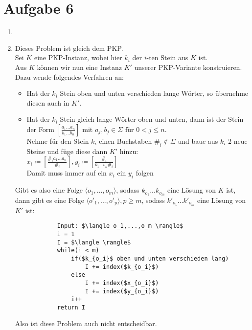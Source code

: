 \documentclass[a4paper,11pt]{scrartcl}
\begin{document}
\newpage
	\section*{Aufgabe 6}
	\begin{enumerate}[label=\alph*)]
	\item	
			
	\item	Dieses Problem ist gleich dem PKP.\\
			Sei $K$ eine PKP-Instanz, wobei hier $k_i$ der $i$-ten Stein aus $K$ ist.\\
			Aus $K$ können wir nun eine Instanz $K'$ unserer PKP-Variante konstruieren. Dazu wende folgendes Verfahren an:
			\begin{itemize}
			\item Hat der $k_i$ Stein oben und unten verschieden lange Wörter, so übernehme diesen auch in $K'$.
			\item Hat der $k_i$ Stein gleich lange Wörter oben und unten, dann ist der Stein der Form $\left[ \frac{a_1...a_n}{b_1...b_n} \right]$ mit $a_j, b_j \in \Sigma$ für $0<j\leq n$.\\
				  Nehme für den Stein $k_i$ einen Buchstaben $\#_i \not\in\Sigma$ und baue aus $k_i$ 2 neue Steine und füge diese dann $K'$ hinzu:\\
				  $x_i\coloneqq \left[ \frac{\#_ia_1...a_n}{\#_i} \right], y_i\coloneqq \left[ \frac{\#_i}{b_1...b_n\#_i} \right]$\\
				  Damit muss immer auf ein $x_i$ ein $y_i$ folgen
			\end{itemize}
			Gibt es also eine Folge $\langle o_1,...,o_m \rangle$, sodass $k_{o_1} ... k_{o_m}$ eine Lösung von $K$ ist, dann gibt es eine Folge $\langle o'_1,...,o'_p \rangle , p \geq m$, sodass $k'_{o_1} ... k'_{o_m}$ eine Lösung von $K'$ ist:
			\begin{lstlisting}
			Input: $\langle o_1,...,o_m \rangle$
			i = 1
			I = $\langle \rangle$
			while(i < m)
				if($k_{o_i}$ oben und unten verschieden lang)
					I += index($k_{o_i}$)
				else
					I += index($x_{o_i}$)
					I += index($y_{o_i}$)
				i++
			return I
			\end{lstlisting}
			Also ist diese Problem auch nicht entscheidbar.
	\end{enumerate}
	
\end{document}
